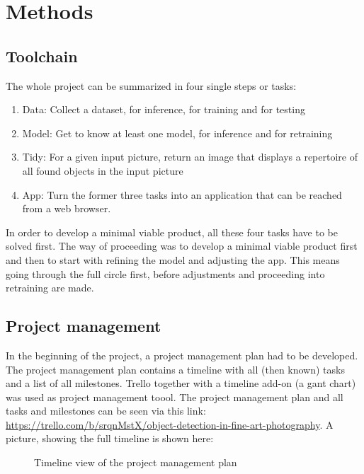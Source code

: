 \chapter{Methods}

\section{Toolchain}

The whole project can be summarized in four single steps or tasks:
\begin{enumerate}
	\item Data: Collect a dataset, for inference, for training and for testing
	\item Model: Get to know at least one model, for inference and for retraining
	\item Tidy: For a given input picture, return an image that displays a repertoire of all found objects in the input picture
	\item App: Turn the former three tasks into an application that can be reached from a web browser.
\end{enumerate}

In order to develop a minimal viable product, all these four tasks have to be solved first. The way of proceeding was to develop a minimal viable product first and then to start with refining the model and adjusting the app. This means going through the full circle first, before adjustments and proceeding into retraining are made.

\section{Project management}

In the beginning of the project, a project management plan had to be developed. The project management plan contains a timeline with all (then known) tasks and a list of all milestones. Trello together with a timeline add-on (a gant chart) was used as project management toool. The project management plan and all tasks and milestones can be seen via this link: \url{https://trello.com/b/srqnMstX/object-detection-in-fine-art-photography}. A picture, showing the full timeline is shown here:

 \begin{figure}
	\caption{\label{fig:project-management-plan} Timeline view of the project management plan}
\end{figure}

